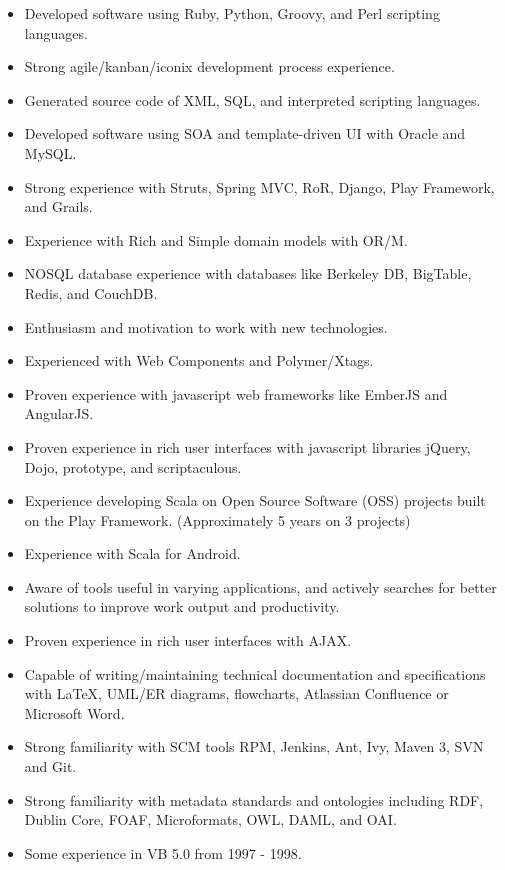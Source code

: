 \documentclass[10pt,letterpaper]{article}
\begin{document}
\begin{itemize}
\item Developed software using Ruby, Python, Groovy, and Perl scripting languages.
\item Strong agile/kanban/iconix development process experience.
\item Generated source code of XML, SQL, and interpreted scripting languages.
\item Developed software using SOA and template-driven UI with Oracle and MySQL.
\item Strong experience with Struts, Spring MVC, RoR, Django, Play Framework, and Grails.
\item Experience with Rich and Simple domain models with OR/M.
\item NOSQL database experience with databases like Berkeley DB, BigTable, Redis, and CouchDB.
\item Enthusiasm and motivation to work with new technologies.
\item Experienced with Web Components and Polymer/Xtags.
\item Proven experience with javascript web frameworks like EmberJS and AngularJS.
\item Proven experience in rich user interfaces with javascript libraries jQuery, Dojo, 
  prototype, and scriptaculous.
\item Experience developing Scala on Open Source Software (OSS) projects built on the Play Framework. (Approximately 5 years on 3 projects)
\item Experience with Scala for Android. 
\item Aware of tools useful in varying applications, and actively
  searches for better solutions to improve work output and productivity.
\item Proven experience in rich user interfaces with AJAX.
\item Capable of writing/maintaining technical documentation and
  specifications with LaTeX, UML/ER diagrams, flowcharts, Atlassian Confluence or Microsoft Word.
\item Strong familiarity with SCM tools RPM, Jenkins, Ant, Ivy, Maven 3, SVN and Git.
\item Strong familiarity with metadata standards and ontologies
  including RDF, Dublin Core, FOAF, Microformats, OWL, DAML, and OAI.
\item Some experience in VB 5.0 from 1997 - 1998.
\end{itemize}
\end{document}
